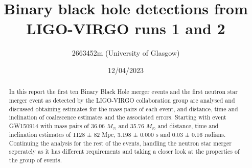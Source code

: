 \documentclass{article}
\title{\textbf{Binary black hole detections from LIGO-VIRGO runs 1 and 2}}
\author{2663452m (University of Glasgow)}
\date{12/04/2023}
\begin{document}
\maketitle

\begin{abstract}
In this report the first ten Binary Black Hole merger events and the first neutron star merger event as
detected by the LIGO-VIRGO collaboration group are analysed and discussed obtaining estimates for the mass
pairs of each event, and distance, time and inclination of coalescence estimates and the associated errors. Starting with
event GW150914 with mass pairs of 36.06 $M_{\odot}$ and 35.76 $M_{\odot}$ and distance, time and inclination estimates of
1128 ± 82 Mpc, 3.198 ± 0.000 s and 0.03 ± 0.16 radians. Continuing the analysis for the rest of the events, handling the neutron star merger
seperately as it has different requirements and taking a closer look at the properties of the group of events.
\end{abstract}
\twocolumn
\newpage
\end{document}
